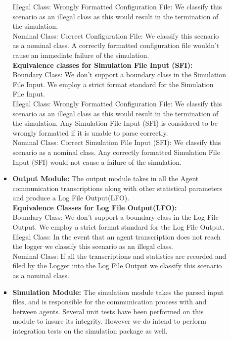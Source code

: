 \begin{enumerate}
\begin{itemize}
\begin{itemize}
Illegal Class: Wrongly Formatted Configuration File: We classify this scenario as an illegal class as this would result in the termination of the simulation. \\

Nominal Class: Correct Configuration File: We classify this scenario as a nominal class. A correctly formatted configuration file wouldn't cause an immediate failure of the
simulation. \\

\textbf{Equivalence classes for Simulation File Input (SFI):} \\
Boundary Class: We don't support a boundary class in the Simulation File Input. We employ a strict format standard for the Simulation File Input. \\

Illegal Class: Wrongly Formatted Configuration File: We classify this scenario as an illegal class as this would result in the termination of the simulation. Any Simulation File Input (SFI) is considered to be wrongly formatted if it is unable to parse correctly. \\

Nominal Class: Correct Simulation File Input (SFI): We classify this scenario as a nominal class. Any correctly formatted Simulation File Input (SFI) would not cause a failure of the simulation. \\

\item \textbf{Output Module:} The output module takes in all the Agent communication transcriptions along with other statistical parameters and produce a Log File Output(LFO). \\

\textbf{Equivalence Classes for Log File Output(LFO):} \\

Boundary Class: We don't support a boundary class in the Log File Output. We employ a strict format standard for the Log File Output. \\

Illegal Class: In the event that an agent transcription does not reach the logger we classify this scenario as an illegal class. \\

Nominal Class: If all the transcriptions and statistics are recorded and filed by the Logger into the Log File Output we classify this scenario as a nominal class. \\

\item \textbf{Simulation Module:} The simulation module takes the parsed input files, and is responsible for the communication process with and between agents. Several unit tests have been performed on this module to insure its integrity. However we do intend to perform integration tests on the simulation package as well. \\


\end{itemize}
\end{itemize}
\end{enumerate}
